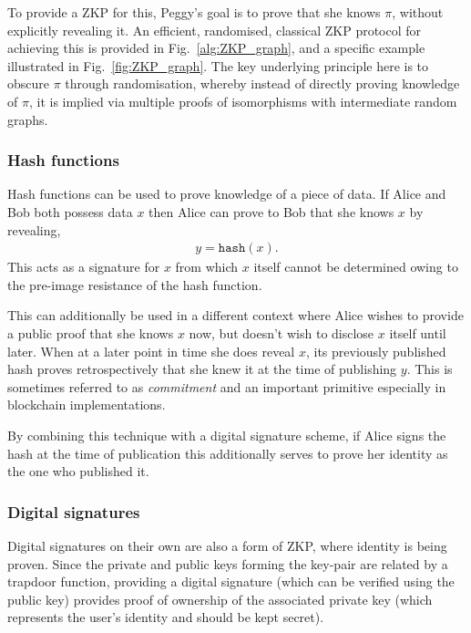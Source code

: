 To provide a ZKP for this, Peggy's goal is to prove that she knows $\pi$, without explicitly revealing it. An efficient, randomised, classical ZKP protocol for achieving this is provided in Fig.~\ref{alg:ZKP_graph}, and a specific example illustrated in Fig.~\ref{fig:ZKP_graph}. The key underlying principle here is to obscure $\pi$ through randomisation, whereby instead of directly proving knowledge of $\pi$, it is implied via multiple proofs of isomorphisms with intermediate random graphs.

\subsubsection{Hash functions}

Hash functions can be used to prove knowledge of a piece of data. If Alice and Bob both possess data $x$ then Alice can prove to Bob that she knows $x$ by revealing,
\begin{align}
y=\texttt{hash}(x).
\end{align}
This acts as a signature for $x$ from which $x$ itself cannot be determined owing to the pre-image resistance of the hash function.

This can additionally be used in a different context where Alice wishes to provide a public proof that she knows $x$ now, but doesn't wish to disclose $x$ itself until later. When at a later point in time she does reveal $x$, its previously published hash proves retrospectively that she knew it at the time of publishing $y$. This is sometimes referred to as \emph{commitment} and an important primitive especially in blockchain implementations.

By combining this technique with a digital signature scheme, if Alice signs the hash at the time of publication this additionally serves to prove her identity as the one who published it.

\subsubsection{Digital signatures}

Digital signatures on their own are also a form of ZKP, where identity is being proven. Since the private and public keys forming the key-pair are related by a trapdoor function, providing a digital signature (which can be verified using the public key) provides proof of ownership of the associated private key (which represents the user's identity and should be kept secret).